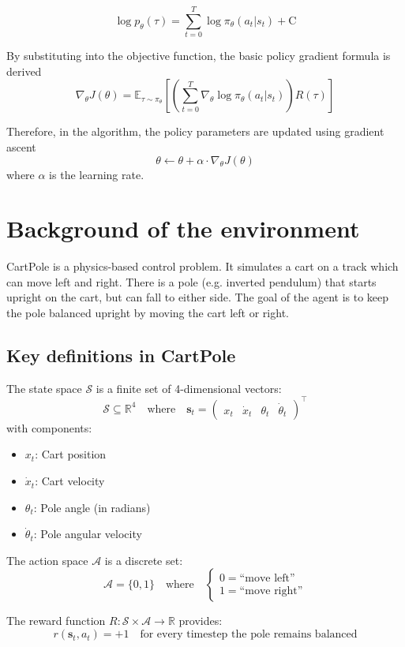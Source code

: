 \documentclass{article} %
\begin{document}
\[\log p_\theta(\tau) = \sum_{t=0}^{T} \log \pi_\theta(a_t|s_t) + \text{C}\]

By substituting into the objective function, the basic policy gradient formula is derived
\[
\nabla_\theta J(\theta) = \mathbb{E}_{\tau \sim \pi_\theta} \left[ \left( \sum_{t=0}^T \nabla_\theta \log \pi_\theta (a_t | s_t) \right) R(\tau) \right]
\]

Therefore, in the algorithm, the policy parameters are updated using gradient ascent
    \[
    \theta \leftarrow \theta + \alpha \cdot \nabla_{\theta} J(\theta)
    \]
where $\alpha$ is the learning rate.

\section{Background of the environment}
CartPole is a physics-based control problem. It simulates a cart on a track which can move left and right. There is a pole (e.g. inverted pendulum) that starts upright on the cart, but can fall to either side. The goal of the agent is to keep the pole balanced upright by moving the cart left or right.

\subsection{Key definitions in CartPole}
The state space $\mathcal{S}$ is a finite set of 4-dimensional vectors:
\[
\mathcal{S} \subseteq \mathbb{R}^4 \quad \text{where} \quad \mathbf{s}_t = \begin{pmatrix}
x_t & \dot{x}_t & \theta_t & \dot{\theta}_t
\end{pmatrix}^\top
\]
with components:
\begin{itemize}
    \item $x_t$: Cart position
    \item $\dot{x}_t$: Cart velocity
    \item $\theta_t$: Pole angle (in radians)
    \item $\dot{\theta}_t$: Pole angular velocity
\end{itemize}

The action space $\mathcal{A}$ is a discrete set:
\[
\mathcal{A} = \{0, 1\} \quad \text{where} \quad 
\begin{cases}
0 = \text{``move left''} \\
1 = \text{``move right''}
\end{cases}
\]

The reward function $R: \mathcal{S} \times \mathcal{A} \to \mathbb{R}$ provides:
\[
r(\mathbf{s}_t, a_t) = +1 \quad \text{for every timestep the pole remains balanced}
\]
\end{document}
